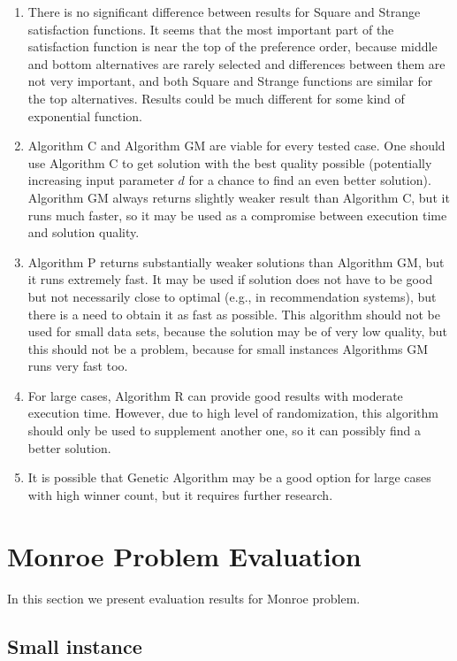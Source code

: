 \begin{enumerate}
	\item There is no significant difference between results for Square and Strange satisfaction functions. It seems that the most important part of the satisfaction function is near the top of the preference order, because middle and bottom alternatives are rarely selected and differences between them are not very important, and both Square and Strange functions are similar for the top alternatives. Results could be much different for some kind of exponential function.
	\item Algorithm C and Algorithm GM are viable for every tested case. One should use Algorithm C to get solution with the best quality possible (potentially increasing input parameter $d$ for a chance to find an even better solution). Algorithm GM always returns slightly weaker result than Algorithm C, but it runs much faster, so it may be used as a compromise between execution time and solution quality.
	\item Algorithm P returns substantially weaker solutions than Algorithm GM, but it runs extremely fast. It may be used if solution does not have to be good but not necessarily close to optimal (e.g., in recommendation systems), but there is a need to obtain it as fast as possible. This algorithm should not be used for small data sets, because the solution may be of very low quality, but this should not be a problem, because for small instances Algorithms GM runs very fast too.
	\item For large cases, Algorithm R can provide good results with moderate execution time. However, due to high level of randomization, this algorithm should only be used to supplement another one, so it can possibly find a better solution.
	\item It is possible that Genetic Algorithm may be a good option for large cases with high winner count, but it requires further research.
\end{enumerate}

\section{Monroe Problem Evaluation}

In this section we present evaluation results for Monroe problem.

\subsection{Small instance}

